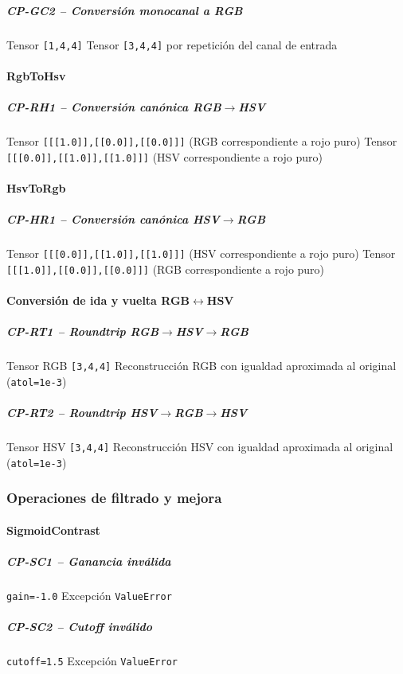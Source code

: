 \subparagraph{CP-GC2 -- Conversión monocanal a RGB}\label{cp:CP-GC2}
\testcasetable
{Tensor \texttt{[1,4,4]}}
{Tensor \texttt{[3,4,4]} por repetición del canal de entrada}

\paragraph{RgbToHsv}
\subparagraph{CP-RH1 -- Conversión canónica RGB$\rightarrow$HSV}\label{cp:CP-RH1}
\testcasetable
{Tensor \texttt{[[[1.0]],[[0.0]],[[0.0]]]} (RGB correspondiente a rojo puro)}
{Tensor \texttt{[[[0.0]],[[1.0]],[[1.0]]]} (HSV correspondiente a rojo puro)}

\paragraph{HsvToRgb}
\subparagraph{CP-HR1 -- Conversión canónica HSV$\rightarrow$RGB}\label{cp:CP-HR1}
\testcasetable
{Tensor \texttt{[[[0.0]],[[1.0]],[[1.0]]]} (HSV correspondiente a rojo puro)}
{Tensor \texttt{[[[1.0]],[[0.0]],[[0.0]]]} (RGB correspondiente a rojo puro)}

\paragraph{Conversión de ida y vuelta RGB$\leftrightarrow$HSV}
\subparagraph{CP-RT1 -- Roundtrip RGB$\rightarrow$HSV$\rightarrow$RGB}\label{cp:CP-RT1}
\testcasetable
{Tensor RGB \texttt{[3,4,4]}}
{Reconstrucción RGB con igualdad aproximada al original (\texttt{atol=1e-3})}

\subparagraph{CP-RT2 -- Roundtrip HSV$\rightarrow$RGB$\rightarrow$HSV}\label{cp:CP-RT2}
\testcasetable
{Tensor HSV \texttt{[3,4,4]}}
{Reconstrucción HSV con igualdad aproximada al original (\texttt{atol=1e-3})}

\newpage

\subsubsection{Operaciones de filtrado y mejora} \label{subsubsec:8_2_3_filters}

\paragraph{SigmoidContrast}
\subparagraph{CP-SC1 -- Ganancia inválida}\label{cp:CP-SC1}
\testcasetable
{\texttt{gain=-1.0}}
{Excepción \texttt{ValueError}}

\subparagraph{CP-SC2 -- \textit{Cutoff} inválido}\label{cp:CP-SC2}
\testcasetable
{\texttt{cutoff=1.5}}
{Excepción \texttt{ValueError}}

